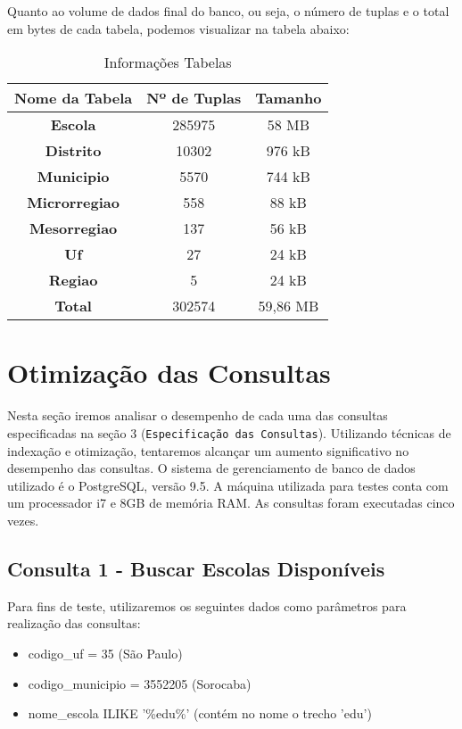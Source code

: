 \documentclass[12pt,a4paper]{article}
\begin{document}
Quanto ao volume de dados final do banco, ou seja, o número de tuplas e o total em bytes de cada tabela, podemos visualizar na tabela abaixo:

\begin{table}[H]
  \centering
  \caption{Informações Tabelas}
    \begin{tabular}{|c|c|c|}
    \toprule
    \hline
    \textbf{Nome da Tabela} & \textbf{Nº de Tuplas} & \textbf{Tamanho} \\
    \midrule
    \hline
    \textbf{Escola} & 285975 & 58 MB \\
    \midrule
    \textbf{Distrito} & 10302 & 976 kB \\
    \midrule
    \textbf{Municipio} & 5570  & 744 kB \\
    \midrule
    \textbf{Microrregiao} & 558   & 88 kB \\
    \midrule
    \textbf{Mesorregiao} & 137   & 56 kB \\
    \midrule
    \textbf{Uf} & 27    & 24 kB \\
    \midrule
    \textbf{Regiao} & 5     & 24 kB \\
    \midrule
    \textbf{Total} & 302574 & 59,86 MB \\
    \bottomrule
    \hline
    \end{tabular}%
  \label{tab:addlabel}%
\end{table}%





\section{Otimização das Consultas}

Nesta seção iremos analisar o desempenho de cada uma das consultas especificadas na seção 3 (\texttt{Especificação das Consultas}). Utilizando técnicas de indexação e otimização, tentaremos alcançar um aumento significativo no desempenho das consultas.
O sistema de gerenciamento de banco de dados utilizado é o PostgreSQL, versão 9.5. A máquina utilizada para testes conta com um processador i7 e 8GB de memória RAM. As consultas foram executadas cinco vezes.

\subsection{Consulta 1 - Buscar Escolas Disponíveis}

Para fins de teste, utilizaremos os seguintes dados como parâmetros para realização das consultas: 
\begin{itemize}
    \item codigo\_uf = 35 (São Paulo)
    \item codigo\_municipio = 3552205 (Sorocaba)
    \item nome\_escola ILIKE '\%edu\%' (contém no nome o trecho 'edu')
\end{itemize}
\end{document}
